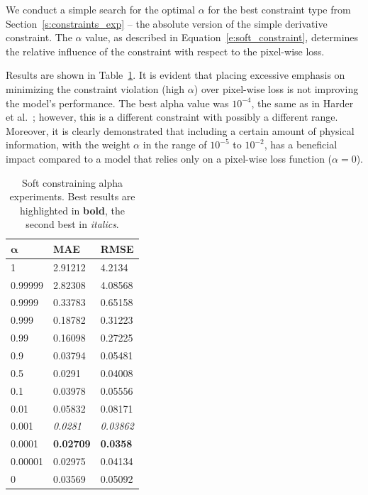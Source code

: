 We conduct a simple search for the optimal $\alpha$ for the best constraint type from Section~\ref{s:constraints_exp} -- the absolute version of the simple derivative constraint.
The $\alpha$ value, as described in Equation~\eqref{e:soft_constraint}, determines the relative influence of the constraint with respect to the pixel-wise loss.

Results are shown in Table~\ref{tab:alpha_exp}.
It is evident that placing excessive emphasis on minimizing the constraint violation (high $\alpha$) over pixel-wise loss is not improving the model's performance.
The best alpha value was $10^{-4}$, the same as in Harder et al.~\cite{Harder2023}; however, this is a different constraint with possibly a different range.
Moreover, it is clearly demonstrated that including a certain amount of physical information, with the weight $\alpha$ in the range of $10^{-5}$ to $10^{-2}$, has a beneficial impact compared to a model that relies only on a pixel-wise loss function ($\alpha = 0$).

\begin{table}[htbp]
    \centering
    \begin{tabular}{|l|l|l|}
        \hline
         $\mathbf{\alpha}$ & \textbf{MAE} & \textbf{RMSE} \\
         \hline
         \hline
         1 & 2.91212 & 4.2134 \\
         \hline
         0.99999 & 2.82308 & 4.08568 \\
         \hline
         0.9999 & 0.33783 & 0.65158 \\
         \hline
         0.999 & 0.18782 & 0.31223 \\
         \hline
         0.99 & 0.16098 & 0.27225 \\
         \hline
         0.9 & 0.03794 & 0.05481 \\
         \hline
         0.5 & 0.0291 & 0.04008 \\
         \hline
         0.1 & 0.03978 & 0.05556 \\
         \hline
         0.01 & 0.05832 & 0.08171 \\
         \hline
         0.001 & \textit{0.0281} & \textit{0.03862} \\
         \hline
         0.0001 & \textbf{0.02709} & \textbf{0.0358} \\
         \hline
         0.00001 & 0.02975 & 0.04134 \\
         \hline
         0 & 0.03569 & 0.05092 \\
         \hline
    \end{tabular}
    \caption[Soft constraining alpha experiments]{Soft constraining alpha experiments. Best results are highlighted in \textbf{bold}, the second best in \textit{italics}.}
    \label{tab:alpha_exp}
\end{table}

